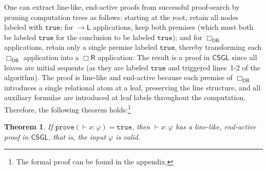 \documentclass[copyright,creativecommons]{eptcs}
\newtheorem{theorem}{Theorem}[section]
\newcommand{\boxr}{\Box\mathsf{R}}
\renewcommand{\phi}{\varphi}
\newcommand{\calc}{\mathsf{CSGL}}
\newcommand{\sar}{\vdash}
\newcommand{\true}{\mathtt{true}}
\newcommand{\prove}{\mathtt{prove}}
\newcommand{\dbr}{\Box_\mathsf{DB}}
\newcommand{\ct}{\mathsf{ct}}
\newcommand{\impl}{{\rightarrow}\mathsf{L}}
\begin{document}

One can extract line-like, end-active proofs from successful
proof-search by pruning computation trees as follows: starting at the root, retain all nodes labeled with $\true$; for $\impl$ applications, keep both premises (which must both be labeled $\true$ for the conclusion to be labeled $\true$); and for $\dbr$ applications, retain only a single premise labeled $\true$, thereby transforming each $\dbr$ application into a $\boxr$ application. The result is a proof in $\calc$ since all leaves are initial sequents (as they are labeled $\true$ and triggered lines~1-2 of the algorithm). The proof is line-like and end-active because each premise
of $\dbr$ introduces a single relational atom at a leaf, preserving the line structure, and all auxiliary formulae are introduced at leaf labels throughout the computation. Therefore, the following theorem holds:\footnote{The formal proof can be found in the appendix.} %

 
\begin{theorem}\label{lem:true-gives-proof}
If $\prove( \sar x : \phi) = \true$, then $\sar x : \phi$ has a line-like, end-active proof in $\calc$, that is, the input $\phi$ is valid.
\end{theorem}
\end{document}
